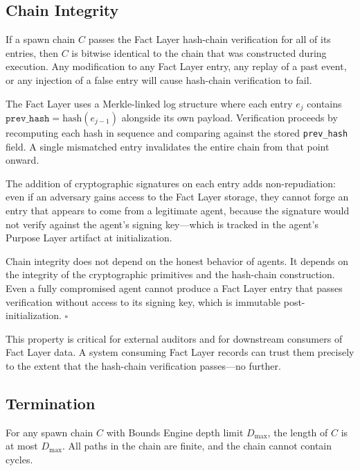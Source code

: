 \subsection{Chain Integrity}
\label{sec:chain_integrity}

\begin{prop}
\label{prop:chain_integrity}
If a spawn chain $C$ passes the Fact Layer hash-chain verification for all of its entries, then $C$ is bitwise identical to the chain that was constructed during execution. Any modification to any Fact Layer entry, any replay of a past event, or any injection of a false entry will cause hash-chain verification to fail.
\end{prop}

\begin{Proof}
The Fact Layer uses a Merkle-linked log structure where each entry $e_j$ contains $\texttt{prev\_hash} = \text{hash}(e_{j-1})$ alongside its own payload. Verification proceeds by recomputing each hash in sequence and comparing against the stored \texttt{prev\_hash} field. A single mismatched entry invalidates the entire chain from that point onward.

The addition of cryptographic signatures on each entry adds non-repudiation: even if an adversary gains access to the Fact Layer storage, they cannot forge an entry that appears to come from a legitimate agent, because the signature would not verify against the agent's signing key—which is tracked in the agent's Purpose Layer artifact at initialization.

Chain integrity does not depend on the honest behavior of agents. It depends on the integrity of the cryptographic primitives and the hash-chain construction. Even a fully compromised agent cannot produce a Fact Layer entry that passes verification without access to its signing key, which is immutable post-initialization. $\square$
\end{Proof}

This property is critical for external auditors and for downstream consumers of Fact Layer data. A system consuming Fact Layer records can trust them precisely to the extent that the hash-chain verification passes—no further.

\subsection{Termination}
\label{sec:termination}

\begin{prop}[Termination]
\label{prop:termination}
For any spawn chain $C$ with Bounds Engine depth limit $D_{\max}$, the length of $C$ is at most $D_{\max}$. All paths in the chain are finite, and the chain cannot contain cycles.
\end{prop}

